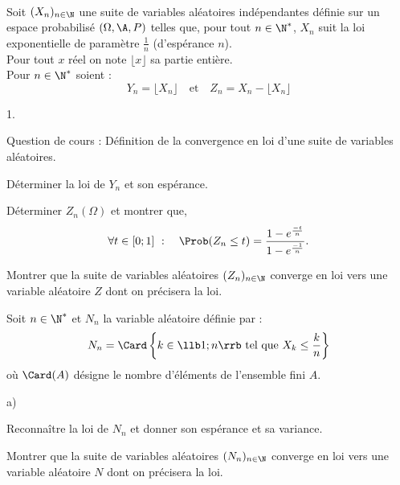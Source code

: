\documentclass[11pt]{article}%
\begin{document}
\begin{exerciceAP}~\\
  Soit $(X_n)_{n \in \N}$ une suite de variables aléatoires
  indépendantes définie sur un espace probabilisé $(\Omega ,
  \A , P)$ telles que, pour tout $n \in \N^*$, $X_n$
  suit la loi exponentielle de paramètre $\frac{1}{n}$ (d'espérance
  $n$).\\
  Pour tout $x$ réel on note $\lfloor x \rfloor$ sa partie entière. \\
  Pour $n \in \N^*$ soient :
  \[
  Y_n = \lfloor X_n \rfloor \ \ \ \text{ et } \ \ \ Z_n = X_n -
  \lfloor X_n \rfloor
  \]
  \begin{noliste}{1.}
    \setlength{\itemsep}{2mm}
  \item Question de cours : Définition de la convergence en loi d'une
    suite de variables aléatoires.
  \item Déterminer la loi de $Y_n$ et son espérance.
  \item Déterminer $Z_n (\Omega)$ et montrer que,
    \[
    \forall t \in [ 0 ; 1]\ :\ \ \ \Prob(Z_n \leq t) = \frac{ 1 -
      e^{\frac{-t}{n} } }{1 - e^{\frac{-1}{n}}}.
    \]
  \item Montrer que la suite de variables aléatoires $(Z_n)_{ n \in
      \N}$ converge en loi vers une variable aléatoire $Z$ dont on
    précisera la loi.
  \item Soit $n \in \N^*$ et $N_n$ la variable aléatoire définie
    par :
    \[
    N_n = \Card \left\{ k \in \llb 1 ; n \rrb \text{ tel que } X_k
      \leq \frac{k}{n} \right\}
    \]
    où $\Card (A)$ désigne le nombre d'éléments de l'ensemble fini $A$.
    \begin{noliste}{a)}
    \setlength{\itemsep}{2mm} \item Reconnaître la loi de $N_n$ et donner
      son espérance et sa variance.
    \item Montrer que la suite de variables aléatoires $(N_n)_{n \in
        \N}$ converge en loi vers une variable aléatoire $N$ dont on
      précisera la loi.
    \end{noliste} 
  \end{noliste}
\end{exerciceAP}
\end{document}

